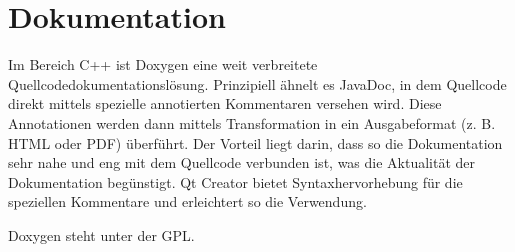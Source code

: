 \section{Dokumentation} 

Im Bereich C++ ist Doxygen \cite{Doxygen} eine weit verbreitete Quellcodedokumentationslösung.
Prinzipiell ähnelt es JavaDoc, in dem Quellcode direkt mittels spezielle annotierten Kommentaren versehen wird.
Diese Annotationen werden dann mittels Transformation in ein Ausgabeformat (z. B. HTML oder PDF) überführt.
Der Vorteil liegt darin, dass so die Dokumentation sehr nahe und eng mit dem Quellcode verbunden ist, was die Aktualität der Dokumentation begünstigt.
Qt Creator bietet Syntaxhervorhebung für die speziellen Kommentare und erleichtert so die Verwendung.

Doxygen steht unter der GPL.
